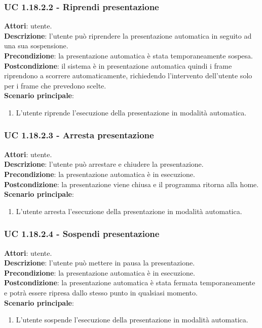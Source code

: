 	\subsubsection{UC 1.18.2.2 - Riprendi presentazione}{
		\label{uc1.18.2.2}
		\textbf{Attori}: utente. \\
		\textbf{Descrizione}: l'utente può riprendere la presentazione automatica in seguito ad una sua sospensione. \\
		\textbf{Precondizione}: la presentazione automatica è stata temporaneamente sospesa.	\\
		\textbf{Postcondizione}: il sistema è in presentazione automatica quindi i frame riprendono a scorrere automaticamente, richiedendo l'intervento dell'utente solo per i frame che prevedono scelte.\\
		\textbf{Scenario principale}:
		\begin{enumerate}
			\item L'utente riprende l'esecuzione della presentazione in modalità automatica.
		\end{enumerate}		
	}
	\subsubsection{UC 1.18.2.3 - Arresta presentazione}{
		\label{uc1.18.2.3}
		\textbf{Attori}: utente. \\
		\textbf{Descrizione}: l'utente può arrestare e chiudere la presentazione. \\
		\textbf{Precondizione}: la presentazione automatica è in esecuzione.	\\
		\textbf{Postcondizione}: la presentazione viene chiusa e il programma ritorna alla home.\\
		\textbf{Scenario principale}:
		\begin{enumerate}
			\item L'utente arresta l'esecuzione della presentazione in modalità automatica.
		\end{enumerate}		
	}
	\subsubsection{UC 1.18.2.4 - Sospendi presentazione}{
		\label{uc1.18.2.4}
		\textbf{Attori}: utente. \\
		\textbf{Descrizione}: l'utente può mettere in pausa la presentazione. \\
		\textbf{Precondizione}: la presentazione automatica è in esecuzione.	\\
		\textbf{Postcondizione}: la presentazione automatica è stata fermata temporaneamente e potrà essere ripresa dallo stesso punto in qualsiasi momento.\\
		\textbf{Scenario principale}:
		\begin{enumerate}
			\item L'utente sospende l'esecuzione della presentazione in modalità automatica.
		\end{enumerate}		
	}

